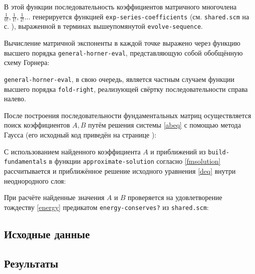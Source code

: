 \documentclass{article}
\newcommand{\filename}[1]{\texttt{#1}}
\newcommand{\procname}[1]{\texttt{#1}}
\numberwithin{equation}{section}
\begin{document}


В этой функции последовательность коэффициентов матричного многочлена
$\frac{1}{0!}, \frac{1}{1!}, \frac{1}{2!} \ldots$ генерируется
функцией \procname{exp-series-coefficients} (см. \filename{shared.scm}
на с. \pageref{shared.scm-full-listing}), выраженной в терминах
вышеупомянутой \procname{evolve-sequence}.

Вычисление матричной экспоненты в каждой точке выражено через
функцию высшего порядка \procname{general-horner-eval}, представляющую
собой обобщённую схему Горнера:



\procname{general-horner-eval}, в свою очередь, является частным случаем
функции высшего порядка \procname{fold-right}, реализующей свёртку
последовательности справа налево.

После построения последовательности фундаментальных матриц
осуществляется поиск коэффициентов $A, B$ путём решения системы
\eqref{abeq} с помощью метода Гаусса (его исходный код приведён на
странице \pageref{gauss.scm-full-listing}):



С использованием найденного коэффициента $A$ и приближений из
\procname{build-fundamentals} в функции
\procname{approximate-solution} согласно \eqref{fmsolution}
рассчитывается и приближённое решение исходного уравнения \eqref{deq}
внутри неоднородного слоя:



При расчёте найденные значения $A$ и $B$ проверяется на удовлетворение
тождеству \eqref{energy} предикатом \procname{energy-conserves?} из
\filename{shared.scm}:



\newpage
\subsection{Исходные данные}
\label{sec:initial}



\subsection{Результаты}


\end{document}
